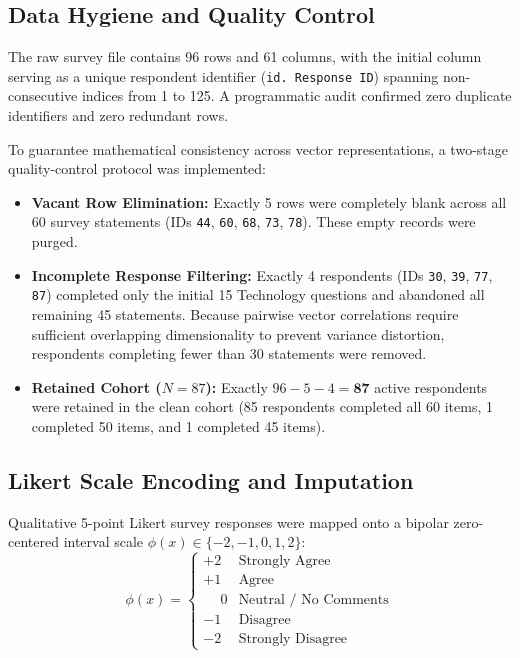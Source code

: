 \documentclass[10pt,twocolumn,a4paper]{article}
\begin{document}
\subsection{Data Hygiene and Quality Control}
The raw survey file contains 96 rows and 61 columns, with the initial column serving as a unique respondent identifier (\texttt{id. Response ID}) spanning non-consecutive indices from 1 to 125. A programmatic audit confirmed zero duplicate identifiers and zero redundant rows.

To guarantee mathematical consistency across vector representations, a two-stage quality-control protocol was implemented:
\begin{itemize}[noitemsep,topsep=1pt,leftmargin=1.2em]
    \item \textbf{Vacant Row Elimination:} Exactly 5 rows were completely blank across all 60 survey statements (IDs \texttt{44}, \texttt{60}, \texttt{68}, \texttt{73}, \texttt{78}). These empty records were purged.
    \item \textbf{Incomplete Response Filtering:} Exactly 4 respondents (IDs \texttt{30}, \texttt{39}, \texttt{77}, \texttt{87}) completed only the initial 15 Technology questions and abandoned all remaining 45 statements. Because pairwise vector correlations require sufficient overlapping dimensionality to prevent variance distortion, respondents completing fewer than 30 statements were removed.
    \item \textbf{Retained Cohort ($N=87$):} Exactly $96 - 5 - 4 = \mathbf{87}$ active respondents were retained in the clean cohort (85 respondents completed all 60 items, 1 completed 50 items, and 1 completed 45 items).
\end{itemize}

\subsection{Likert Scale Encoding and Imputation}
Qualitative 5-point Likert survey responses were mapped onto a bipolar zero-centered interval scale $\phi(x) \in \{-2, -1, 0, 1, 2\}$:
\begin{equation}
\label{eq:likert_mapping}
\phi(x) = \begin{cases} 
+2 & \text{Strongly Agree} \\
+1 & \text{Agree} \\
\phantom{+}0 & \text{Neutral / No Comments} \\
-1 & \text{Disagree} \\
-2 & \text{Strongly Disagree}
\end{cases}
\end{equation}
\end{document}
